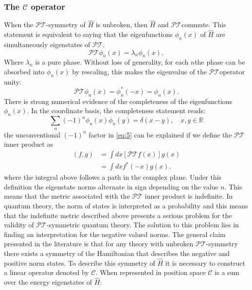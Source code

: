 \documentclass[12pt, a4paper]{report}
\newcommand\PT{\(\mathcal{PT}\)}
\newcommand\CC{\(\mathcal{C}\)}
\begin{document}
\subsubsection{The $\mathcal{C}$ operator}\label{CC}
When the \PT-symmetry of $\hat{H}$ is unbroken, then $\hat{H}$ and \PT\:commute. This statement is equivalent to saying that the eigenfunctions $\phi_n(x)$ of $\hat{H}$ are simultaneously eigenstates of \PT\cite{Bender_2004}.
\begin{equation}\label{eq:3}
\mathcal{PT}\phi_n(x) = \lambda_n \phi_n(x),
\end{equation}
Where $\lambda_n$ is a pure phase. Without loss of generality, for each $n$the phase can be absorbed into $\phi_n(x)$ by rescaling, this makes the eigenvalue of the \PT operator unity\cite{Bender_2004}: 
\begin{equation}\label{eq:4}
\mathcal{PT}\phi_n(x) = \phi_{n}^{*}(-x) = \phi_n(x).
\end{equation}
There is strong numerical evidence of the completeness of the eigenfunctions $\phi_n(x)$\cite{ComplexExtension}\cite{Bender_2004}\cite{Brody_2013}. In the coordinate basis, the completeness statement reads:
\begin{equation}\label{eq:5}
\sum_{n}(-1)^{n}\phi_n(x)\phi_n(y) = \delta(x-y),\quad x, y \in \mathbb{R}
\end{equation}
the unconventional $(-1)^n$ factor in \ref{eq:5} can be explained if we define the \PT\:inner product as
\begin{align}\label{eq:6}
\left ( f, g \right )  & = \int dx \left [ \mathcal{PT} f(x) \right ] g(x)\nonumber\\
                       & = \int dx f^{*}(-x) g(x).
\end{align}
where the integral above follows a path in the complex plane. Under this definition the eigenstate norms alternate in sign depending on the value $n$. This means that the metric associated with the \PT\: inner product is indefinite\cite{Bender_2004}\cite{Critique}.
In quantum theory, the norm of states is interpreted as a probability and this means that the indefinite metric described above presents a serious problem for the validity of \PT-symmetric quantum theory. The solution to this problem lies in finding an interpretation for
the negative valued norms\cite{PT-symmetricQM}. The general claim presented in the literature is that for any theory with unbroken \PT-symmetry there
exists a symmetry of the Hamiltonian that describes the negative and positive norm states. To describe this symmetry of $\hat{H}$ it is necessary to construct a linear operator denoted by \CC\cite{MustaHbeHermitian}\cite{ComplexExtension}\cite{Bender_2004}. When represented in position space \CC\: is a sum over the energy eigenstates of $\hat{H}$:
\end{document}
